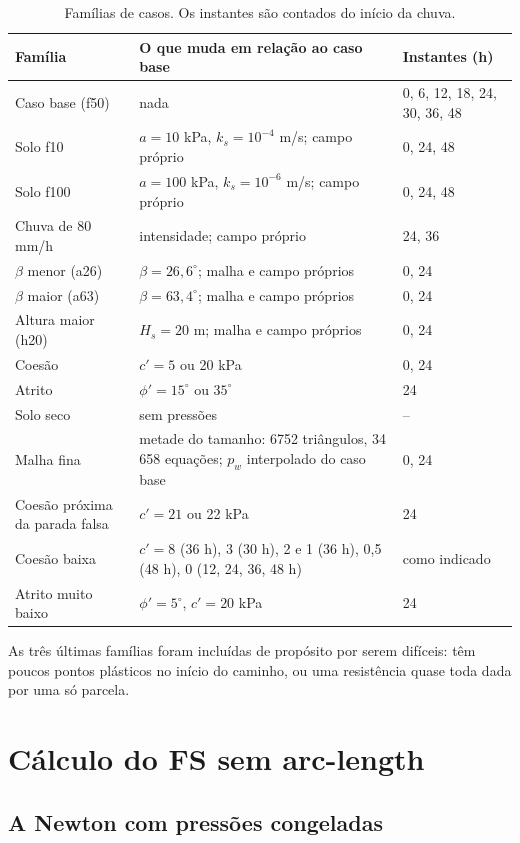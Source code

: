 \documentclass[11pt,a4paper]{article}
\numberwithin{equation}{section}
\begin{document}
\begin{table}[htbp]
\centering\small
\caption{Famílias de casos. Os instantes são contados do início da chuva.}\label{tab:familias}
\begin{tabular}{p{3.4cm}p{7.6cm}p{3.6cm}}
\toprule
Família & O que muda em relação ao caso base & Instantes (h) \\
\midrule
Caso base (f50) & nada & 0, 6, 12, 18, 24, 30, 36, 48 \\
Solo f10 & $a = 10$ kPa, $k_s = 10^{-4}$ m/s; campo próprio & 0, 24, 48 \\
Solo f100 & $a = 100$ kPa, $k_s = 10^{-6}$ m/s; campo próprio & 0, 24, 48 \\
Chuva de 80 mm/h & intensidade; campo próprio & 24, 36 \\
$\beta$ menor (a26) & $\beta = 26{,}6^\circ$; malha e campo próprios & 0, 24 \\
$\beta$ maior (a63) & $\beta = 63{,}4^\circ$; malha e campo próprios & 0, 24 \\
Altura maior (h20) & $H_s = 20$ m; malha e campo próprios & 0, 24 \\
Coesão & $c' = 5$ ou 20 kPa & 0, 24 \\
Atrito & $\phi' = 15^\circ$ ou $35^\circ$ & 24 \\
Solo seco & sem pressões & -- \\
Malha fina & metade do tamanho: 6752 triângulos, 34\,658 equações; $p_w$ interpolado do caso base & 0, 24 \\
Coesão próxima da parada falsa & $c' = 21$ ou 22 kPa & 24 \\
Coesão baixa & $c' = 8$ (36 h), 3 (30 h), 2 e 1 (36 h), 0,5 (48 h), 0 (12, 24, 36, 48 h) & como indicado \\
Atrito muito baixo & $\phi' = 5^\circ$, $c' = 20$ kPa & 24 \\
\bottomrule
\end{tabular}
\end{table}

As três últimas famílias foram incluídas de propósito por serem difíceis: têm poucos pontos plásticos no início do caminho, ou uma
resistência quase toda dada por uma só parcela.


\section{Cálculo do FS sem arc-length}\label{sec:lista}

\subsection{A Newton com pressões congeladas}\label{sec:newton}
\end{document}
